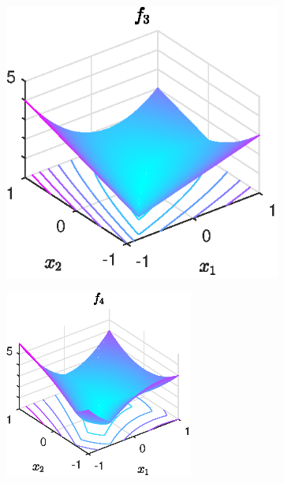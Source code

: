 \begin{figure}[ht]
\begin{subfigure}[t]{0.32\textwidth}
	\end{subfigure}
	\begin{subfigure}[t]{0.32\textwidth}
		\includegraphics[width=\textwidth]{Pictures/Plots/testfun_f3.eps}
	\end{subfigure}
	\newline
	\begin{subfigure}{0.47\textwidth}
		\begin{flushright}
		\includegraphics[width=0.68\textwidth]{Pictures/Plots/testfun_f4}
		\end{flushright}

\end{subfigure}
\end{figure}
